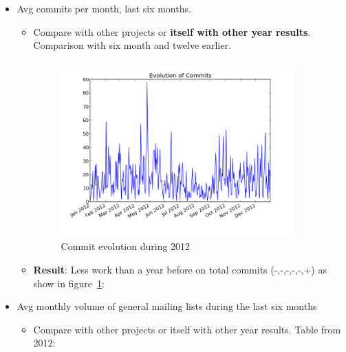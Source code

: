\documentclass[11pt]{scrartcl}
\begin{document}
\begin{itemize}
    \item Avg commits per month, last six months.
        \begin{itemize}
            \item Compare with other projects or \textbf{itself with other year results}. Comparison with six month and twelve earlier.
            \begin{figure}[H]
            \begin{center}
              \includegraphics[width=0.9\textwidth]{libcsvanaly2/script_sample/basic_timeseries.png}
              \caption{Commit evolution during 2012}
              \label{fig:2012-monthy-commmits}
            \end{center}
            \end{figure}

            \item \textbf{Result}: Less work than a year before on total commits (-,-,-,-,-,+) as show in figure~\ref{fig:2012-monthy-commmits}:
        \end{itemize}
    \item Avg monthly volume of general mailing lists during the last six months
    \begin{itemize}
        \item Compare with other projects or itself with other year results. Table from 2012:


\end{itemize}
\end{itemize}
\end{document}
